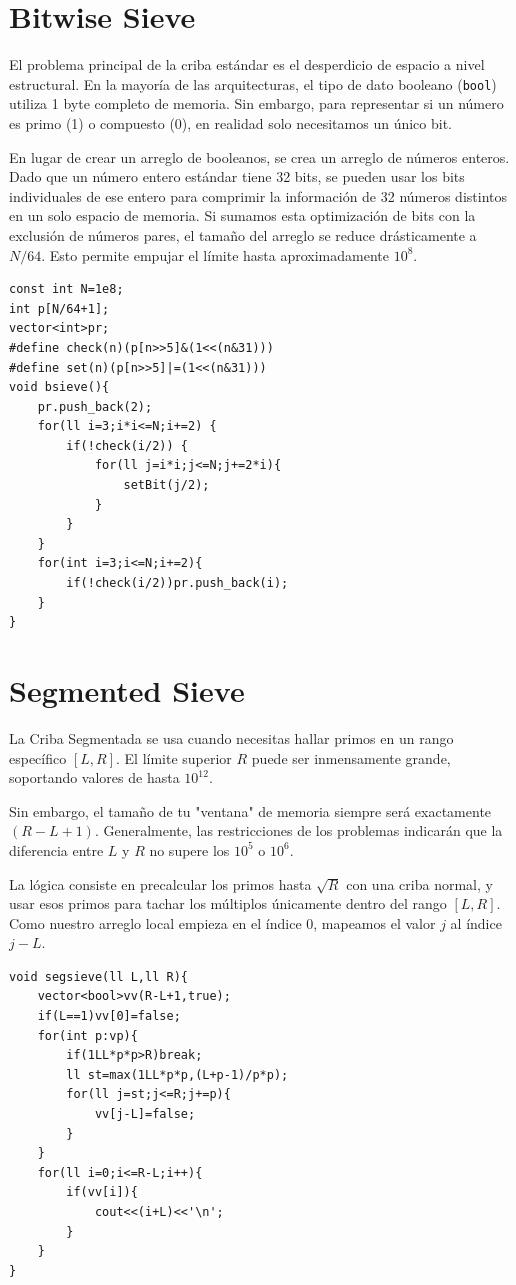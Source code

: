 \documentclass[12pt]{article}
\begin{document}
\section{Bitwise Sieve}
El problema principal de la criba estándar es el desperdicio de espacio a nivel estructural. En la mayoría de las arquitecturas, el tipo de dato booleano (\texttt{bool}) utiliza 1 byte completo de memoria. Sin embargo, para representar si un número es primo (1) o compuesto (0), en realidad solo necesitamos un único bit.\par
En lugar de crear un arreglo de booleanos, se crea un arreglo de números enteros. Dado que un número entero estándar tiene 32 bits, se pueden usar los bits individuales de ese entero para comprimir la información de 32 números distintos en un solo espacio de memoria. Si sumamos esta optimización de bits con la exclusión de números pares, el tamaño del arreglo se reduce drásticamente a $N/64$. Esto permite empujar el límite hasta aproximadamente $10^8$.
\begin{lstlisting}
const int N=1e8;
int p[N/64+1];
vector<int>pr;
#define check(n)(p[n>>5]&(1<<(n&31)))
#define set(n)(p[n>>5]|=(1<<(n&31)))
void bsieve(){
    pr.push_back(2);
    for(ll i=3;i*i<=N;i+=2) {
        if(!check(i/2)) {
            for(ll j=i*i;j<=N;j+=2*i){
                setBit(j/2);
            }
        }
    }
    for(int i=3;i<=N;i+=2){
        if(!check(i/2))pr.push_back(i);
    }
}
\end{lstlisting}
\section{Segmented Sieve}
La Criba Segmentada se usa cuando necesitas hallar primos en un rango específico $[L, R]$. El límite superior $R$ puede ser inmensamente grande, soportando valores de hasta $10^{12}$.\par
Sin embargo, el tamaño de tu "ventana" de memoria siempre será exactamente $(R - L + 1)$. Generalmente, las restricciones de los problemas indicarán que la diferencia entre $L$ y $R$ no supere los $10^5$ o $10^6$.\par 
La lógica consiste en precalcular los primos hasta $\sqrt{R}$ con una criba normal, y usar esos primos para tachar los múltiplos únicamente dentro del rango $[L, R]$. Como nuestro arreglo local empieza en el índice 0, mapeamos el valor $j$ al índice $j - L$.
\begin{lstlisting}
void segsieve(ll L,ll R){
    vector<bool>vv(R-L+1,true);
    if(L==1)vv[0]=false;
    for(int p:vp){
        if(1LL*p*p>R)break;
        ll st=max(1LL*p*p,(L+p-1)/p*p);
        for(ll j=st;j<=R;j+=p){
            vv[j-L]=false;
        }
    }
    for(ll i=0;i<=R-L;i++){
        if(vv[i]){
            cout<<(i+L)<<'\n';
        }
    }
}
\end{lstlisting}
\end{document}
